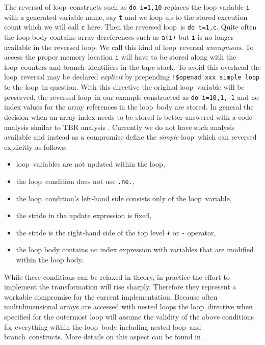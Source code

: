 \documentclass{book}
\newcommand{\Loop}{loop}
\newcommand{\branch}{branch}
\begin{document}
The reversal of  \Loop\ constructs such as \lstinline{do i=1,10} replaces 
the loop variable \lstinline{i} with a generated variable name, say \lstinline{t} and we 
loop up to  the stored execution count which we will call  \lstinline{c} here. 
Then the reversed \Loop\ is \lstinline{do t=1,c}. Quite often the loop body contains 
array dereferences such as \lstinline{a(i)} but \lstinline{i} is no longer available in the 
reversed \Loop. We call this kind of \Loop\ reversal {\em anonymous}. 
To access the proper memory location \lstinline{i} will have to be stored along with the 
\Loop\ counters and \branch\ identifiers in the tape stack.
To avoid this overhead the \Loop\ reversal may be declared {\em explicit}
by prepending \lstinline{!$openad xxx simple loop} to the \Loop\ in question. 
With this directive the original \Loop\ variable will be preserved,  
the reversed \Loop\ in our example constructed as \lstinline{do i=10,1,-1} and 
no index values for the array references in the \Loop\ body are stored. 
In general the decision when an array index needs to be stored is better answered 
with a code analysis similar to TBR analysis \cite{Hascoet2005bra}. 
Currently we do not have such  analysis available and instead 
as a compromise define the {\em simple}
\Loop\ which can reversed explicitly as follows. 
\begin{itemize}
  \parskip = -2pt
\item \Loop\ variables are not updated within the loop,
\item the \Loop\ condition does not use \lstinline{.ne.},
\item the \Loop\ condition's left-hand side consists only of the \Loop\ variable,
\item the stride in the update expression is fixed,
\item the stride is the right-hand side of the top level \lstinline{+} or \lstinline{-} operator,
\item the loop body contains no index expression with variables that are modified within the loop body.
\end{itemize}
While these conditions can be relaxed in theory, in practice the effort to implement 
the transformation will rise sharply. Therefore they represent a workable compromise 
for the current implementation. 
Because often multidimensional arrays  are accessed with nested loops the 
\Loop\ directive when specified for the outermost loop will assume the validity 
of the above conditions for everything within the \Loop\ body including nested 
\Loop\ and \branch\ constructs. More details on this aspect can be found in 
\cite{Utke2006ERo}. 
\end{document}
